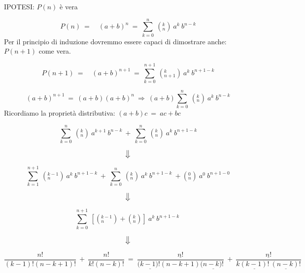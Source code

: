\documentclass[../rip.tex]{subfiles}
\begin{document}
\begin{dimo}
IPOTESI: $P(n)$ è vera
	
	\begin{equation}
	P(n)\ =\quad (a+b)^n\ =\ \sum_{k=0}^{n}\ (_{n}^{k})\ a^k\ b^{n-k}
	\end{equation}
Per il principio di induzione dovremmo essere capaci di dimostrare anche: 
$P(n+1)$ come vera.

	\begin{equation}
	P(n+1)\ =\quad (a+b)^{n+1}\ =\ 
	\sum_{k=0}^{n+1}\ (_{n+1}^{k})\ a^k\ b^{n+1-k} 
	\end{equation}

	\begin{equation}
	(a+b)^{n+1}\ =\ (a+b)(a+b)^n\ \Rightarrow\ 
	(a+b)\sum_{k=0}^{n}\ (_{n}^{k})\ a^k\ b^{n-k}
	\end{equation}
Ricordiamo la proprietà distributiva: $(a+b)c\ =\ ac + bc$

	\begin{equation}
	\sum_{k=0}^{n}\ (_{n}^{k})\ a^{k+1}\ b^{n-k}\ +\ 
	\sum_{k=0}^{n}\ (_{n}^{k})\ a^k\ b^{n+1-k}
	\end{equation}

	\begin{equation*} 
	\big\Downarrow
	\end{equation*}

	\begin{equation}
	\sum_{k=1}^{n+1}\ (_{n}^{k-1})\ a^{k}\ b^{n+1-k}\ + \ 
	\sum_{k=0}^{n}\ (_{n}^{k})\ a^k\ b^{n+1-k}\ + (_{n}^{0})\ a^0\ b^{n+1-0}
	\end{equation}

	\begin{equation*} 
	\big\Downarrow
	\end{equation*}
	
	\begin{equation}
	\sum_{k=0}^{n+1}\ [(_{n}^{k-1}) + (_{n}^{k})]\ a^{k}\ b^{n+1-k}\
	\end{equation}
	
	\begin{equation*}
	\big\Downarrow
	\end{equation*}
	
	\begin{equation}
	\frac{n!}{(k-1)!(n-k+1)!}\ +\ \frac{n!}{k!(n-k)!}\ =\
	\frac{\underline{n!}}{(\underline{k-1)!}(n-k+1)(\underline{n-k)!}}\ +\ 
	\frac{\underline{n!}}{k\underline{(k-1)!}\ \underline{(n-k)!}}
	\end{equation}
			

\end{dimo}
\end{document}
